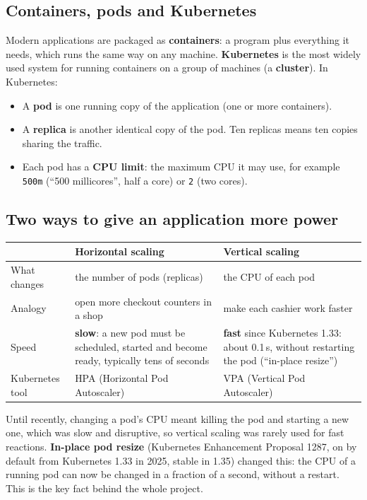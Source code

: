 \documentclass[11pt,a4paper]{article}
\begin{document}
\subsection{Containers, pods and Kubernetes}
Modern applications are packaged as \textbf{containers}: a program plus everything it
needs, which runs the same way on any machine. \textbf{Kubernetes} is the most widely used
system for running containers on a group of machines (a \textbf{cluster}). In Kubernetes:
\begin{itemize}
\item A \textbf{pod} is one running copy of the application (one or more containers).
\item A \textbf{replica} is another identical copy of the pod. Ten replicas means ten
copies sharing the traffic.
\item Each pod has a \textbf{CPU limit}: the maximum CPU it may use, for example
\texttt{500m} (``500 millicores'', half a core) or \texttt{2} (two cores).
\end{itemize}

\subsection{Two ways to give an application more power}
\begin{center}
\begin{tabular}{@{}p{3.2cm}p{5.6cm}p{6cm}@{}}
\toprule
 & \textbf{Horizontal scaling} & \textbf{Vertical scaling} \\
\midrule
What changes & the number of pods (replicas) & the CPU of each pod \\
Analogy & open more checkout counters in a shop & make each cashier work faster \\
Speed & \textbf{slow}: a new pod must be scheduled, started and become ready, typically tens of seconds & \textbf{fast} since Kubernetes 1.33: about 0.1\,s, without restarting the pod (``in-place resize'') \\
Kubernetes tool & HPA (Horizontal Pod Autoscaler) & VPA (Vertical Pod Autoscaler) \\
\bottomrule
\end{tabular}
\end{center}

Until recently, changing a pod's CPU meant killing the pod and starting a new one, which
was slow and disruptive, so vertical scaling was rarely used for fast reactions.
\textbf{In-place pod resize} (Kubernetes Enhancement Proposal 1287, on by default from
Kubernetes 1.33 in 2025, stable in 1.35) changed this: the CPU of a running pod can now be
changed in a fraction of a second, without a restart. This is the key fact behind the
whole project.
\end{document}
